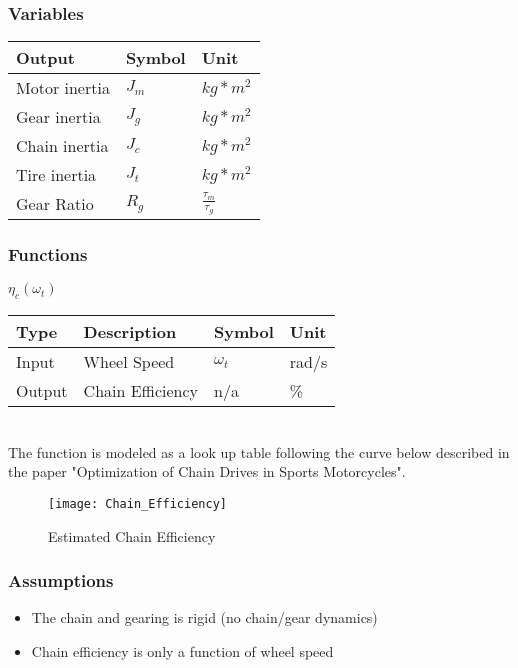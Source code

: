 \documentclass[../SimBALink.tex]{subfiles}
\begin{document}
\subsubsection{Variables}
	\begin{tabular}{ l | l | l  }
		Output					&	Symbol		&	Unit		\\	\hline
		Motor inertia		&	$J_m$		&	 $kg*m^2$ \\ 
		Gear inertia		&	$J_g$		&	 $kg*m^2$ \\ 
		Chain inertia		&	$J_c$		&	 $kg*m^2$ \\ 
		Tire inertia		&	$J_t$		&	 $kg*m^2$ \\ 
		Gear Ratio			&	$R_g$		&	$\frac{\tau_m}{\tau_g}$
	\end{tabular}
	
\subsubsection{Functions}
$\eta_c(\omega_t)$ \\
	\begin{tabular}{ l | l | l | l }
		Type				& Description		&	Symbol		&	Unit		\\	\hline
		Input 				& Wheel Speed		&	$\omega_t$  & 	rad/s		\\
		Output 				& Chain Efficiency	&	n/a			&	\%
	\end{tabular} \\

The function is modeled as a look up table following the curve below described in the paper "Optimization of Chain Drives in Sports Motorcycles".

\begin{figure}[h!]
  \centering
  \texttt{[image: Chain\_Efficiency]}
  \caption{Estimated Chain Efficiency}
\end{figure}

\subsubsection{Assumptions}
\begin{itemize}
  \item The chain and gearing is rigid (no chain/gear dynamics)
  \item Chain efficiency is only a function of wheel speed
\end{itemize}
\end{document}
